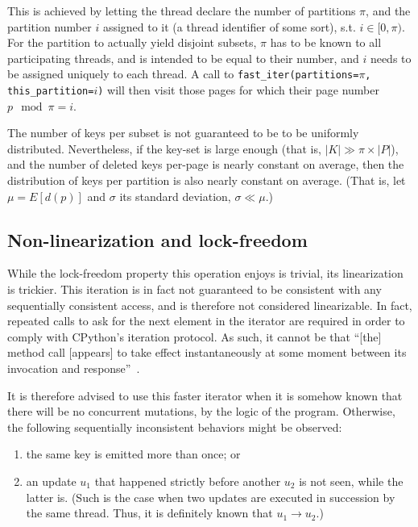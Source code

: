 This is achieved by letting the thread declare the number of partitions $\pi$, and the partition number $i$ assigned to it (a thread identifier of some sort), s.t. $i \in [0, \pi)$.
For the partition to actually yield disjoint subsets, $\pi$ has to be known to all participating threads, and is intended to be equal to their number, and $i$ needs to be assigned uniquely to each thread.
A call to \texttt{{fast\_iter(partitions=$\pi$, this\_partition=$i$)}} will then visit those pages for which their page number $p \mod \pi = i$.

The number of keys per subset is not guaranteed to be to be uniformly distributed.
Nevertheless, if the key-set is large enough (that is, $|K| \gg \pi \times |P|$), and the number of deleted keys per-page is nearly constant on average, then the distribution of keys per partition is also nearly constant on average.
(That is, let $\mu = E[d(p)]$ and $\sigma$ its standard deviation, $\sigma \ll \mu$.)

\subsection{Non-linearization and lock-freedom}\label{subsec:iteration-linearization-lock-freedom}
While the lock-freedom property this operation enjoys is trivial, its linearization is trickier.
This iteration is in fact not guaranteed to be consistent with any sequentially consistent access, and is therefore not considered linearizable.
In fact, repeated calls to ask for the next element in the iterator are required in order to comply with CPython's iteration protocol.
As such, it cannot be that ``[the] method call [appears] to take effect instantaneously at some moment between its invocation and response''~\cite[Principle~3.5.1]{art-mp}.

It is therefore advised to use this faster iterator when it is somehow known that there will be no concurrent mutations, by the logic of the program.
Otherwise, the following sequentially inconsistent behaviors might be observed:
\begin{enumerate}
    \item the same key is emitted more than once; or
    \item an update $u_1$ that happened strictly before another $u_2$ is not seen, while the latter is.
    (Such is the case when two updates are executed in succession by the same thread.
    Thus, it is definitely known that $u_1 \rightarrow u_2$.)
\end{enumerate}

